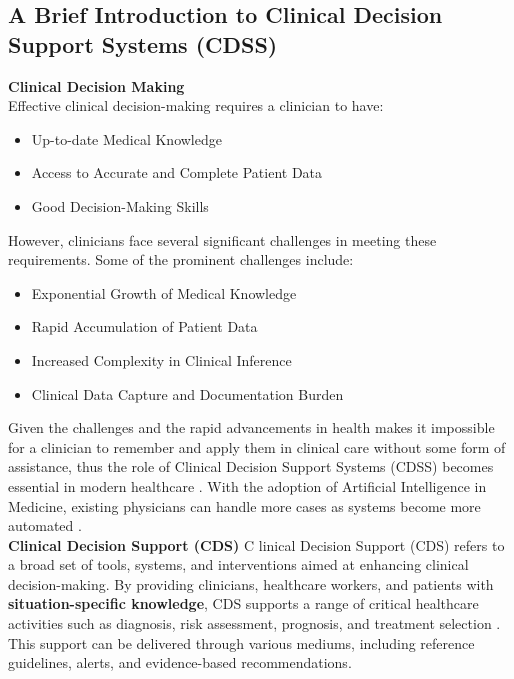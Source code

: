 \subsection{A Brief Introduction to Clinical Decision Support Systems (CDSS)}
\textcolor{TUMBlue}{\textbf{Clinical Decision Making}}\\
\noindent Effective clinical decision-making requires a clinician to have:
\begin{itemize}
    \item Up-to-date Medical Knowledge
    \item Access to Accurate and Complete Patient Data
    \item Good Decision-Making Skills
\end{itemize}
\noindent However, clinicians face several significant challenges in meeting these requirements. Some of the prominent challenges include:
\begin{itemize}
    \item Exponential Growth of Medical Knowledge
    \item Rapid Accumulation of Patient Data
    \item Increased Complexity in Clinical Inference
    \item Clinical Data Capture and Documentation Burden
\end{itemize}

\noindent Given the challenges and the rapid advancements in health makes it impossible for a clinician to remember and apply them in clinical care without some form of assistance, thus the role of Clinical Decision Support Systems (CDSS) becomes essential in modern healthcare \cite{visweswaran2022integration}. With the adoption of Artificial Intelligence in Medicine, existing physicians can handle more cases as systems become more automated \cite{panch2018artificial}.\\[\baselineskip]

\noindent \textcolor{TUMBlue}{\textbf{Clinical Decision Support (CDS)}}
\noindent \lettrine{C}{ }linical Decision Support (CDS) refers to a broad set of tools, systems, and interventions aimed at enhancing clinical decision-making. By providing clinicians, healthcare workers, and patients with \textcolor{TUMRed}{\textbf{situation-specific knowledge}}, CDS supports a range of critical healthcare activities such as diagnosis, risk assessment, prognosis, and treatment selection \cite{osheroff2007roadmap}. This support can be delivered through various mediums, including reference guidelines, alerts, and evidence-based recommendations.\\[\baselineskip]

